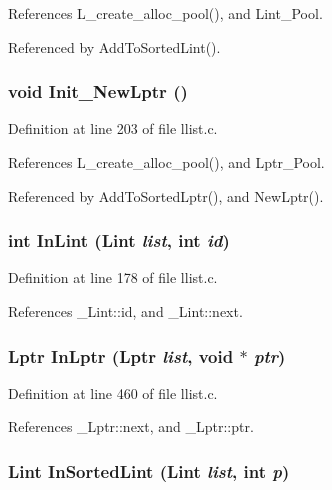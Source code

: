 References L\_\-create\_\-alloc\_\-pool(), and Lint\_\-Pool.

Referenced by Add\-To\-Sorted\-Lint().
\subsubsection{\setlength{\rightskip}{0pt plus 5cm}void Init\_\-New\-Lptr ()}\label{llist_8c_622392b18fe97d8f706b69b0b9d7a3e7}




Definition at line 203 of file llist.c.

References L\_\-create\_\-alloc\_\-pool(), and Lptr\_\-Pool.

Referenced by Add\-To\-Sorted\-Lptr(), and New\-Lptr().
\subsubsection{\setlength{\rightskip}{0pt plus 5cm}int In\-Lint (\bf{Lint} {\em list}, int {\em id})}\label{llist_8c_741b1cdeb16cb480a49ad3b39f7b4e7f}




Definition at line 178 of file llist.c.

References \_\-Lint::id, and \_\-Lint::next.
\subsubsection{\setlength{\rightskip}{0pt plus 5cm}\bf{Lptr} In\-Lptr (\bf{Lptr} {\em list}, void $\ast$ {\em ptr})}\label{llist_8c_0ffb12ff243e0d9f8ca3dcf0538a46b3}




Definition at line 460 of file llist.c.

References \_\-Lptr::next, and \_\-Lptr::ptr.
\subsubsection{\setlength{\rightskip}{0pt plus 5cm}\bf{Lint} In\-Sorted\-Lint (\bf{Lint} {\em list}, int {\em p})}\label{llist_8c_026e63fa5c8f60bc43653dce8eca11d4}





